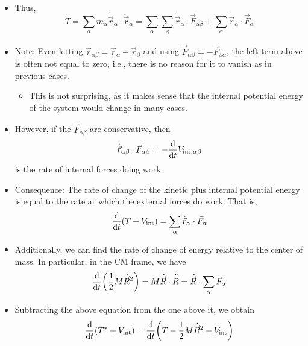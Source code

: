 \documentclass[../notes.tex]{subfiles}
\begin{document}
\begin{itemize}
\begin{itemize}
\begin{itemize}
            \item Thus,
            \begin{equation*}
                \dot{T} = \sum_\alpha m_\alpha\dot{\vec{r}}_\alpha\cdot\ddot{\vec{r}}_\alpha
                = \sum_\alpha\sum_\beta\dot{\vec{r}}_\alpha\cdot\vec{F}_{\alpha\beta}+\sum_\alpha\dot{\vec{r}}_\alpha\cdot\vec{F}_\alpha
            \end{equation*}
            \item Note: Even letting $\vec{r}_{\alpha\beta}=\vec{r}_\alpha-\vec{r}_\beta$ and using $\vec{F}_{\alpha\beta}=-\vec{F}_{\beta\alpha}$, the left term above is often not equal to zero, i.e., there is no reason for it to vanish as in previous cases.
            \begin{itemize}
                \item This is not surprising, as it makes sense that the internal potential energy of the system would change in many cases.
            \end{itemize}
            \item However, if the $\vec{F}_{\alpha\beta}$ are conservative, then
            \begin{equation*}
                \dot{\vec{r}}_{\alpha\beta}\cdot\vec{F}_{\alpha\beta} = -\dv{t}V_{\text{int},\alpha\beta}
            \end{equation*}
            is the rate of internal forces doing work.
            \item Consequence: The rate of change of the kinetic plus internal potential energy is equal to the rate at which the external forces do work. That is,
            \begin{equation*}
                \dv{t}(T+V_\text{int}) = \sum_\alpha\dot{\vec{r}}_\alpha\cdot\vec{F}_\alpha
            \end{equation*}
            \item Additionally, we can find the rate of change of energy relative to the center of mass. In particular, in the CM frame, we have
            \begin{equation*}
                \dv{t}(\frac{1}{2}M\dot{\vec{R}}^2) = M\dot{\vec{R}}\cdot\ddot{\vec{R}}
                = \dot{\vec{R}}\cdot\sum_\alpha\vec{F}_\alpha
            \end{equation*}
            \item Subtracting the above equation from the one above it, we obtain
            \begin{align*}
                \dv{t}(T^*+V_\text{int}) &= \dv{t}(T-\frac{1}{2}M\dot{\vec{R}}^2+V_\text{int})\\

\end{align*}
\end{itemize}
\end{itemize}
\end{itemize}
\end{document}
